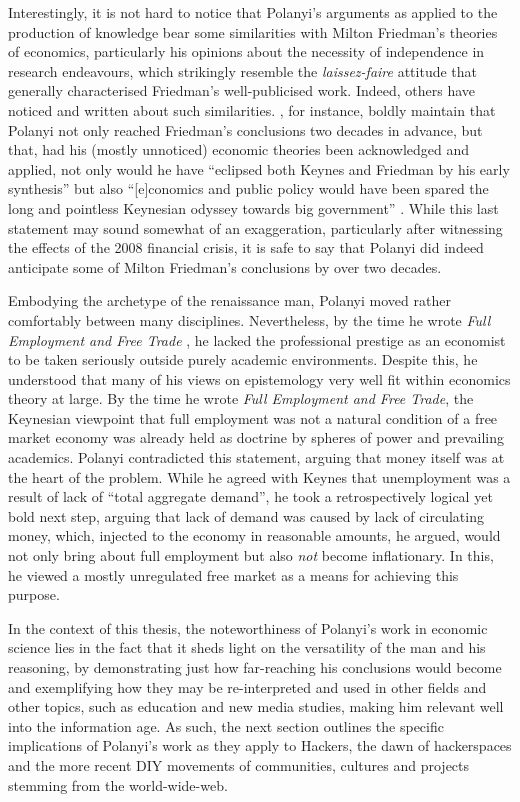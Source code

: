 Interestingly, it is not hard to notice that Polanyi's arguments as applied to the production of knowledge bear some similarities with Milton Friedman's theories of economics, particularly his opinions about the necessity of independence in research endeavours, which strikingly resemble the \textit{laissez-faire} attitude that generally characterised Friedman's well-publicised work. Indeed, others have noticed and written about such similarities. \citet{roberts99}, for instance, boldly maintain that Polanyi not only reached Friedman's conclusions two decades in advance, but that, had his (mostly unnoticed) economic theories been acknowledged and applied, not only would he have ``eclipsed both Keynes and Friedman by his early synthesis'' but also ``[e]conomics and public policy would have been spared the long and pointless Keynesian odyssey towards big government'' \citep[pp.575--576]{roberts99}. While this last statement may sound somewhat of an exaggeration, particularly after witnessing the effects of the 2008 financial crisis, it is safe to say that Polanyi did indeed anticipate some of Milton Friedman's conclusions by over two decades.

Embodying the archetype of the renaissance man, Polanyi moved rather comfortably between many disciplines. Nevertheless, by the time he wrote \textit{Full Employment and Free Trade} \citep{polanyi45}, he lacked the professional prestige as an economist to be taken seriously outside purely academic environments. Despite this, he understood that many of his views on epistemology very well fit within economics theory at large. By the time he wrote \textit{Full Employment and Free Trade}, the Keynesian viewpoint that full employment was not a natural condition of a free market economy was already held as doctrine by spheres of power and prevailing academics. Polanyi contradicted this statement, arguing that money itself was at the heart of the problem. While he agreed with Keynes that unemployment was a result of lack of ``total aggregate demand'', he took a retrospectively logical yet bold next step, arguing that lack of demand was caused by lack of circulating money, which, injected to the economy in reasonable amounts, he argued, would not only bring about full employment but also \emph{not} become inflationary. In this, he viewed a mostly unregulated free market as a means for achieving this purpose.

In the context of this thesis, the noteworthiness of Polanyi's work in economic science lies in the fact that it sheds light on the versatility of the man and his reasoning, by demonstrating just how far-reaching his conclusions would become and exemplifying how they may be re-interpreted and used in other fields and other topics, such as education and new media studies, making him relevant well into the information age. As such, the next section outlines the specific implications of Polanyi's work as they apply to Hackers, the dawn of hackerspaces and the more recent DIY movements of communities, cultures and projects stemming from the world-wide-web.

